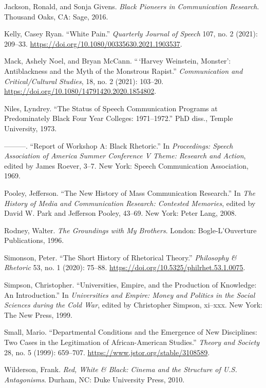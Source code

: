 \documentclass{tufte-handout}
\begin{document}
\begin{hangparas}{.25in}{1}
Jackson, Ronald, and Sonja Givens. \emph{Black Pioneers in Communication
Research}. Thousand Oaks, CA: Sage, 2016.

Kelly, Casey Ryan. ``White Pain.'' \emph{Quarterly Journal of Speech}
107, no. 2 (2021): 209--33.
\url{https://doi.org/10.1080/00335630.2021.1903537}.

Mack, Ashely Noel, and Bryan McCann. ``\,`Harvey Weinstein, Monster':
Antiblackness and the Myth of the Monstrous Rapist.''
\emph{Communication and Critical/Cultural Studies}, 18, no. 2 (2021):
103--20. \url{https://doi.org/10.1080/14791420.2020.1854802}.

Niles, Lyndrey. ``The Status of Speech Communication Programs at
Predominately Black Four Year Colleges: 1971--1972.'' PhD diss., Temple
University, 1973.

---------. ``Report of Workshop A: Black Rhetoric.'' In
\emph{Proceedings: Speech Association of America Summer Conference V
Theme: Research and Action}, edited by James Roever, 3--7. New York:
Speech Communication Association, 1969.

Pooley, Jefferson. ``The New History of Mass Communication Research.''
In \emph{The History of Media and Communication Research: Contested
Memories}, edited by David W. Park and Jefferson Pooley, 43--69. New
York: Peter Lang, 2008.

Rodney, Walter. \emph{The Groundings with My Brothers}. London:
Bogle-L'Ouverture Publications, 1996.

Simonson, Peter. ``The Short History of Rhetorical Theory.''
\emph{Philosophy \& Rhetoric} 53, no. 1 (2020): 75--88.
\url{https://doi.org/10.5325/philrhet.53.1.0075}.

Simpson, Christopher. ``Universities, Empire, and the Production of
Knowledge: An Introduction.'' In \emph{Universities and Empire: Money
and Politics in the Social Sciences during the Cold War}, edited by
Christopher Simpson, xi--xxx. New York: The New Press, 1999.

Small, Mario. ``Departmental Conditions and the Emergence of New
Disciplines: Two Cases in the Legitimation of African-American
Studies.'' \emph{Theory and Society} 28, no. 5 (1999): 659--707.
\url{https://www.jstor.org/stable/3108589}.

Wilderson, Frank. \emph{Red, White \& Black: Cinema and the Structure of
U.S. Antagonisms}. Durham, NC: Duke University Press, 2010.



\end{hangparas}
\end{document}

